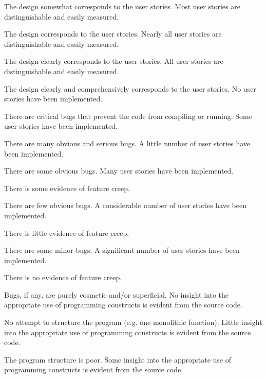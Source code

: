 \documentclass{../fal_assignment}
\begin{document}
\begin{markingrubric}
            \par The design somewhat corresponds to the user stories.
        \grade Most user stories are distinguishable and easily measured.
            \par The design corresponds to the user stories.
        \grade Nearly all user stories are distinguishable and easily measured.
            \par The design clearly corresponds to the user stories.
        \grade All user stories are distinguishable and easily measured.
            \par The design clearly and comprehensively corresponds to the user stories.
%
        \grade\fail No user stories have been implemented.
            \par There are critical bugs that prevent the code from compiling or running.
        \grade Some user stories have been implemented.
            \par There are many obvious and serious bugs.
        \grade A little number of user stories have been implemented.
            \par There are some obvious bugs.
        \grade Many user stories have been implemented.
            \par There is some evidence of feature creep.
            \par There are few obvious bugs.
        \grade A considerable number of user stories have been implemented.
            \par There is little evidence of feature creep.
            \par There are some minor bugs.
        \grade A significant number of user stories have been implemented.
            \par There is no evidence of feature creep.
            \par Bugs, if any, are purely cosmetic and/or superficial.
%
        \grade\fail No insight into the appropriate use of programming constructs is evident from the source code.
            \par No attempt to structure the program (e.g. one monolithic function).
        \grade Little insight into the appropriate use of programming constructs is evident from the source code.
            \par The program structure is poor.
        \grade Some insight into the appropriate use of programming constructs is evident from the source code.

\end{markingrubric}
\end{document}
